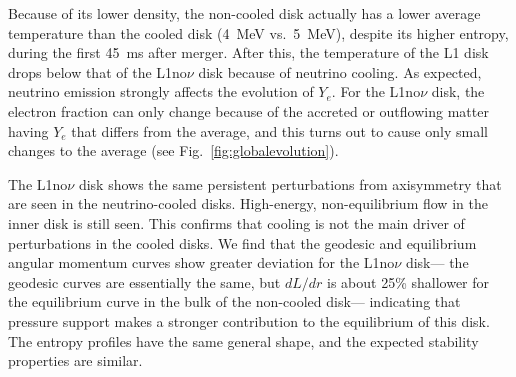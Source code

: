 Because of its lower density, the
non-cooled disk actually has a lower average temperature than the
cooled disk (4~MeV vs.\ 5~MeV), despite its higher entropy, during the
first 45~ms after merger.  After this, the temperature of the L1 disk
drops below that of the L1no$\nu$ disk because of neutrino cooling.  As
expected, neutrino emission strongly affects the evolution of $Y_e$. 
For the L1no$\nu$ disk, the electron fraction can only change because of
the accreted or outflowing matter having $Y_e$ that differs from the
average, and this turns out to cause only small changes to the
average (see Fig.~\ref{fig:globalevolution}).

The L1no$\nu$ disk shows the same persistent perturbations from axisymmetry
that are seen in the neutrino-cooled disks.  High-energy, non-equilibrium
flow in the inner disk is still seen.  This confirms that cooling is not
the main driver
of perturbations in the cooled disks.  We find that the geodesic and equilibrium
angular momentum curves show greater deviation for the L1no$\nu$ disk---
the geodesic curves are essentially the same, but $dL/dr$ is about 25\%
shallower for the equilibrium curve in the bulk of the non-cooled disk---
indicating that pressure support makes a stronger contribution to the
equilibrium of this disk.  The entropy profiles have the same general
shape, and the expected stability properties are similar.
